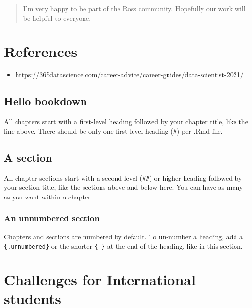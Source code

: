 \documentclass[
]{book}
\providecommand{\tightlist}{%
  \setlength{\itemsep}{0pt}\setlength{\parskip}{0pt}}
\begin{document}
\begin{quote}
I'm very happy to be part of the Ross community. Hopefully our work will be helpful to everyone.
\end{quote}

\hypertarget{references}{%
\chapter*{References}\label{references}}

\begin{itemize}
\tightlist
\item
  \url{https://365datascience.com/career-advice/career-guides/data-scientist-2021/}
\end{itemize}

\hypertarget{hello-bookdown}{%
\section*{Hello bookdown}\label{hello-bookdown}}

All chapters start with a first-level heading followed by your chapter title, like the line above. There should be only one first-level heading (\texttt{\#}) per .Rmd file.

\hypertarget{a-section}{%
\section{A section}\label{a-section}}

All chapter sections start with a second-level (\texttt{\#\#}) or higher heading followed by your section title, like the sections above and below here. You can have as many as you want within a chapter.

\hypertarget{an-unnumbered-section}{%
\subsection*{An unnumbered section}\label{an-unnumbered-section}}

Chapters and sections are numbered by default. To un-number a heading, add a \texttt{\{.unnumbered\}} or the shorter \texttt{\{-\}} at the end of the heading, like in this section.

\hypertarget{challenges-for-international-students}{%
\chapter*{Challenges for International students}\label{challenges-for-international-students}}
\end{document}
